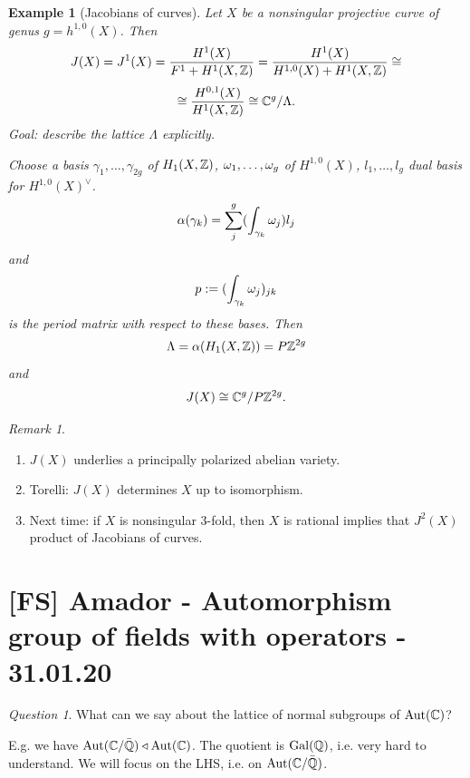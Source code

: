 \documentclass[A4paper, british, reqno]{amsart}
\theoremstyle{darkgreentheorem}
\theoremstyle{darkbluedefinition}
\theoremstyle{darkredexample}
\newtheorem{exa}[thm]{Example}
\theoremstyle{remark}
\newtheorem{rem}[thm]{Remark}
\newtheorem{q}[thm]{Question}
\DeclareMathOperator{\Aut}{Aut}
\DeclareMathOperator{\Gal}{Gal}
\newcommand{\1}{\mathbbm{1}}
\newcommand{\dual}{^{\vee}}
\newcommand{\normal}{\triangleleft}
\begin{document}
\begin{exa}[Jacobians of curves]
    Let $X$ be a nonsingular projective curve of genus $g=h^{1,0}(X)$.
    Then 
    \[ J(X)=J^{1}(X)=\frac{H^{1}(X)}{F^{1}+H^{1}(X,\mathbb{Z})}=\frac{H^{1}(X)}{H^{1,0}(X)+H^{1}(X,\mathbb{Z})}\cong \]
    \[\cong \frac{H^{0,1}(X)}{H^{1}(X,\mathbb{Z})}\cong \mathbb{C}^{g}/\Lambda. \]
    Goal: describe the lattice $\Lambda$ explicitly.
    \begin{center}
    \end{center}
    Choose a basis $\gamma_{1},\ldots,\gamma_{2g}$ of $H_{1}(X,\mathbb{Z})$, $\omega_{1},\ldots,\omega_{g}$ of $H^{1,0}(X)$, $l_{1},\ldots,l_{g}$ dual basis for $H^{1,0}(X)\dual$.
    \[ \alpha(\gamma_{k})=\sum_{j}^{g}(\int_{\gamma_{k}}\omega_{j})l_{j} \]
    and
    \[ p:= (\int_{\gamma_{k}}\omega_{j})_{jk} \]
    is the \textit{period matrix} with respect to these bases.
    Then
    \[ \Lambda=\alpha(H_{1}(X,\mathbb{Z}))=P\mathbb{Z}^{2g} \]
    and 
    \[ J(X)\cong \mathbb{C}^{g}/P\mathbb{Z}^{2g}. \]
\end{exa}

\begin{rem}
    \begin{enumerate}
	\item $J(X)$ underlies a principally polarized abelian variety.
	\item Torelli: $J(X)$ determines $X$ up to isomorphism.
	\item Next time: if $X$ is nonsingular $3$-fold, then $X$ is rational implies that $J^{2}(X)$ product of Jacobians of curves.
    \end{enumerate}
\end{rem}

\section{[FS] Amador - Automorphism group of fields with operators - 31.01.20}

\begin{q}
    What can we say about the lattice of normal subgroups of $\Aut(\C)$?
\end{q}

E.g. we have $\Aut(\C/\bar{\Q})\normal \Aut(\C)$.
The quotient is $\Gal(\Q)$, i.e. very hard to understand.
We will focus on the LHS, i.e. on $\Aut(\C/\bar{\Q})$.
\end{document}
